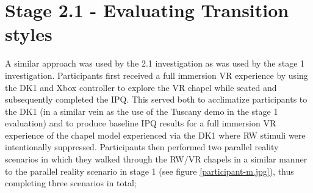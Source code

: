 



\section{Stage 2.1 - Evaluating Transition styles}

A similar approach was used by the 2.1 investigation as was used by the stage 1 investigation. Participants first received a full immersion VR experience by using the DK1 and Xbox controller to explore the VR chapel while seated and subsequently completed the IPQ. This served both to acclimatize participants to the DK1 (in a similar vein as the use of the Tuscany demo in the stage 1 evaluation) and to produce baseline IPQ results for a full immersion VR experience of the chapel model experienced via the DK1 where RW stimuli were intentionally suppressed. Participants then performed two parallel reality scenarios in which they walked through the RW/VR chapels in a similar manner to the parallel reality scenario in stage 1 (see figure \ref{participant-m.jpg}), thus completing three scenarios in total;

